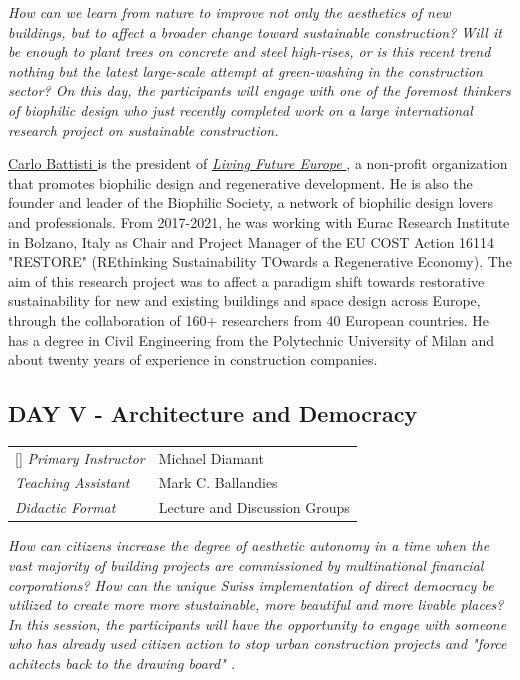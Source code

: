 \documentclass{article}
\begin{document}
\textit{How can we learn from nature to improve not only the aesthetics of new buildings, but to affect a broader change toward sustainable construction? Will it be enough to plant trees on concrete and steel high-rises, or is this recent trend nothing but the latest large-scale attempt at green-washing in the construction sector? On this day, the participants will engage with one of the foremost thinkers of biophilic design who just recently completed work on a large international research project on sustainable construction.}

\href{https://www.linkedin.com/in/carlobattisti/}{Carlo Battisti \ExternalLink} is the president of \href{https://www.living-future.eu}{\textit{Living Future Europe} \ExternalLink}, a non-profit organization that promotes biophilic design and regenerative development. He is also the founder and leader of the Biophilic Society, a network of biophilic design lovers and professionals. From 2017-2021, he was working with Eurac Research Institute in Bolzano, Italy as Chair and Project Manager of the EU COST Action 16114 "RESTORE" (REthinking Sustainability TOwards a Regenerative Economy). The aim of this research project was to affect a paradigm shift towards restorative sustainability for new and existing buildings and space design across Europe, through the collaboration of 160+ researchers from 40 European countries. He has a degree in Civil Engineering from the Polytechnic University of Milan and about twenty years of experience in construction companies.

\clearpage
\subsection{DAY V - Architecture and Democracy}

\begin{NiceTabular}{W{l}{3cm}l}[]
\textit{Primary Instructor} & Michael Diamant \\
\textit{Teaching Assistant} & Mark C. Ballandies \\
\textit{Didactic Format} & Lecture and Discussion Groups
\end{NiceTabular}

\textit{How can citizens increase the degree of aesthetic autonomy in a time when the vast majority of building projects are commissioned by multinational financial corporations? How can the unique Swiss implementation of direct democracy be utilized to create more more stustainable, more beautiful and more livable places? In this session, the participants will have the opportunity to engage with someone who has already used citizen action to stop urban construction projects and "force achitects back to the drawing board" \cite{natalia_michael_2021}.}
\end{document}
